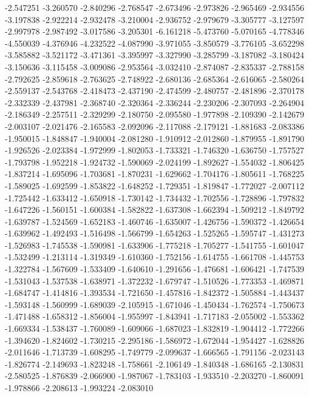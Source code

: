 -2.547251
-3.260570
-2.840296
-2.768547
-2.673496
-2.973826
-2.965469
-2.934556
-3.197838
-2.922214
-2.932478
-3.210004
-2.936752
-2.979679
-3.305777
-3.127597
-2.997978
-2.987492
-3.017586
-3.205301
-6.161218
-5.473760
-5.070165
-4.778346
-4.550039
-4.376946
-4.232522
-4.087990
-3.971055
-3.850579
-3.776105
-3.652298
-3.585882
-3.521172
-3.471361
-3.395997
-3.327990
-3.285799
-3.187082
-3.180424
-3.150636
-3.115458
-3.009086
-2.953564
-3.032410
-2.874087
-2.835337
-2.788158
-2.792625
-2.859618
-2.763625
-2.748922
-2.680136
-2.685364
-2.616065
-2.580264
-2.559137
-2.543768
-2.418473
-2.437190
-2.474599
-2.480757
-2.481896
-2.370178
-2.332339
-2.437981
-2.368740
-2.320364
-2.336244
-2.230206
-2.307093
-2.264904
-2.186349
-2.257511
-2.329299
-2.180750
-2.095580
-1.977898
-2.109390
-2.142679
-2.003107
-2.021476
-2.165583
-2.092096
-2.117088
-2.179121
-1.881683
-2.083386
-1.950015
-1.848847
-1.940004
-2.081280
-1.910912
-2.012860
-1.879955
-1.891790
-1.926526
-2.023384
-1.972999
-1.802053
-1.733321
-1.746320
-1.636750
-1.757527
-1.793798
-1.952218
-1.924732
-1.590069
-2.024199
-1.892627
-1.554032
-1.806425
-1.837214
-1.695096
-1.703681
-1.870231
-1.629662
-1.704176
-1.805611
-1.768225
-1.589025
-1.692599
-1.853822
-1.648252
-1.729351
-1.819847
-1.772027
-2.007112
-1.725442
-1.633412
-1.650918
-1.730142
-1.734432
-1.702556
-1.728896
-1.797832
-1.647226
-1.560151
-1.600384
-1.582822
-1.637308
-1.662394
-1.509212
-1.849792
-1.639787
-1.524569
-1.652183
-1.460746
-1.635007
-1.426756
-1.590372
-1.426654
-1.639962
-1.492493
-1.516498
-1.566799
-1.654263
-1.525265
-1.595747
-1.431273
-1.526983
-1.745538
-1.590981
-1.633906
-1.775218
-1.705277
-1.541755
-1.601047
-1.532499
-1.213114
-1.319349
-1.610360
-1.752156
-1.614755
-1.661708
-1.445753
-1.322784
-1.567609
-1.533409
-1.640610
-1.291656
-1.476681
-1.606421
-1.747539
-1.531043
-1.537538
-1.638971
-1.372232
-1.679747
-1.510526
-1.773353
-1.469871
-1.684747
-1.414816
-1.393534
-1.721650
-1.457816
-1.842372
-1.505884
-1.443437
-1.593148
-1.560999
-1.689039
-2.105915
-1.671046
-1.450434
-1.762574
-1.750673
-1.471488
-1.658312
-1.856004
-1.955997
-1.843941
-1.717183
-2.055002
-1.553362
-1.669334
-1.538437
-1.760089
-1.609066
-1.687023
-1.832819
-1.904412
-1.772266
-1.394620
-1.824602
-1.730215
-2.295186
-1.586972
-1.672044
-1.954427
-1.628826
-2.011646
-1.713739
-1.608295
-1.749779
-2.099637
-1.666565
-1.791156
-2.023143
-1.826774
-2.149693
-1.823248
-1.758661
-2.106149
-1.840348
-1.686165
-2.130831
-2.580525
-1.876839
-2.066900
-1.987067
-1.783103
-1.933510
-2.203270
-1.860091
-1.978866
-2.208613
-1.993224
-2.083010
